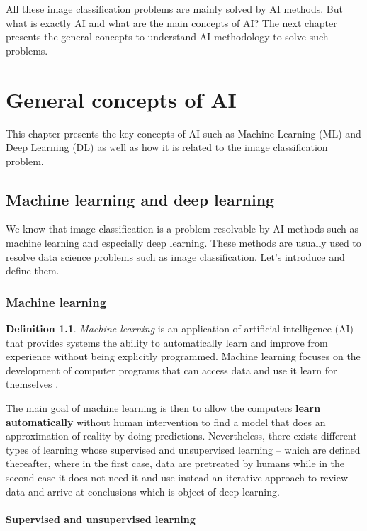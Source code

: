 \documentclass[11pt, openany]{report}
\theoremstyle{plain}
\theoremstyle{definition}
\newtheorem{defn}{Definition}[section]
\theoremstyle{remark}
\begin{document}
All these image classification problems are mainly solved by AI methods. But what is exactly AI and what are the main concepts of AI? The next chapter presents the general concepts to understand AI methodology to solve such problems. 

\chapter{General concepts of AI} \label{chap:AI}
This chapter presents the key concepts of AI such as Machine Learning (ML) and Deep Learning (DL) as well as how it is related to the image classification problem. 

\section{Machine learning and deep learning}
We know that image classification is a problem resolvable by AI methods such as machine learning and especially deep learning. These methods are usually used to resolve data science problems such as image classification. Let's introduce and define them.

\subsection{Machine learning}

\begin{defn}
\textit{Machine learning} is an application of artificial intelligence (AI) that provides systems the ability to automatically learn and improve from experience without being explicitly programmed. Machine learning focuses on the development of computer programs that can access data and use it learn for themselves \cite{ML-1}. 
\end{defn}

The main goal of machine learning is then to allow the computers \textbf{learn automatically} without human intervention to find a model that does an approximation of reality by doing predictions. Nevertheless, there exists different types of learning whose supervised and unsupervised learning -- which are defined thereafter, where in the first case, data are pretreated by humans while in the second case it does not need it and use instead an iterative approach to review data and arrive at conclusions which is object of deep learning. 

\subsubsection{Supervised and unsupervised learning} \label{sec:supervised-unsupervised}
\end{document}
